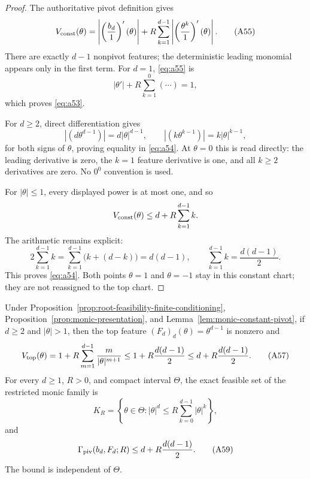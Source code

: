 \begin{proof}
The authoritative pivot definition gives
\[
V_{\rm const}(\theta)
=\left|\left(\frac{b_d}{1}\right)'(\theta)\right|
+R\sum_{k=1}^{d-1}
 \left|\left(\frac{\theta^k}{1}\right)'(\theta)\right|.
\tag{A55}\label{eq:a55}
\]
There are exactly $d-1$ nonpivot features; the deterministic leading
monomial appears only in the first term.  For $d=1$, \eqref{eq:a55} is
\[
|\theta'|+R\sum_{k=1}^0(\cdots)=1,
\]
which proves \eqref{eq:a53}.

For $d\geq2$, direct differentiation gives
\[
|(d\theta^{d-1})|=d|\theta|^{d-1},
\qquad
|(k\theta^{k-1})|=k|\theta|^{k-1},
\]
for both signs of $\theta$, proving equality in \eqref{eq:a54}.  At
$\theta=0$ this is read directly: the leading derivative is zero, the
$k=1$ feature derivative is one, and all $k\geq2$ derivatives are zero.
No $0^0$ convention is used.

For $|\theta|\leq1$, every displayed power is at most one, and so
\[
V_{\rm const}(\theta)\leq d+R\sum_{k=1}^{d-1}k.
\]
The arithmetic remains explicit:
\[
2\sum_{k=1}^{d-1}k
=\sum_{k=1}^{d-1}\bigl(k+(d-k)\bigr)
=d(d-1),
\qquad
\sum_{k=1}^{d-1}k=\frac{d(d-1)}2.
\tag{A56}\label{eq:a56}
\]
This proves \eqref{eq:a54}.  Both points $\theta=1$ and $\theta=-1$ stay
in this constant chart; they are not reassigned to the top chart.
\end{proof}

\begin{proposition}
\label{prop:monic-global-pivot}
Under Proposition~\ref{prop:root-feasibility-finite-conditioning},
Proposition~\ref{prop:monic-presentation}, and
Lemma~\ref{lem:monic-constant-pivot}, if $d\geq2$ and $|\theta|>1$, then
the top feature $(F_d)_d(\theta)=\theta^{d-1}$ is nonzero and
\[
V_{\rm top}(\theta)
=1+R\sum_{m=1}^{d-1}\frac{m}{|\theta|^{m+1}}
\leq1+R\frac{d(d-1)}2
\leq d+R\frac{d(d-1)}2.
\tag{A57}\label{eq:a57}
\]
For every $d\geq1$, $R>0$, and compact interval $\Theta$, the exact
feasible set of the restricted monic family is
\[
K_R=\left\{\theta\in\Theta:
 |\theta|^d\leq R\sum_{k=0}^{d-1}|\theta|^k\right\},
\tag{A58}\label{eq:a58}
\]
and
\[
\Gamma_{\rm piv}(b_d,F_d;R)
\leq d+R\frac{d(d-1)}2.
\tag{A59}\label{eq:a59}
\]
The bound is independent of $\Theta$.
\end{proposition}

